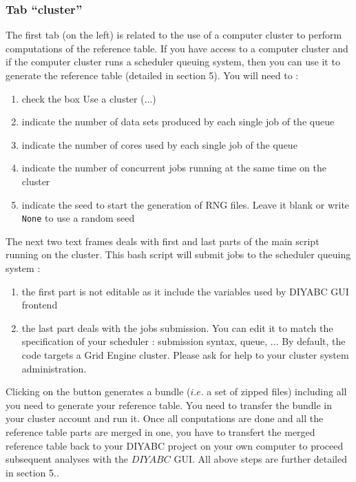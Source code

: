 \subsubsection{Tab \textsf{``cluster''}}\label{clustergui}
The first tab (on the left) is related to the use of a computer cluster to perform computations of the reference table. If you have access to a computer cluster and if the computer cluster runs a scheduler queuing system, then you can use it to generate the reference table (detailed in section 5). You will need to :
\begin{enumerate}
 \item check the box \textsf{Use a cluster (...)}
 \item indicate the number of data sets produced by each single job of the queue
 \item indicate the number of cores used by each single job of the queue
 \item indicate the number of concurrent jobs running at the same time on the cluster
 \item indicate the seed to start the generation of RNG files. Leave it blank or write \texttt{None} to use a random seed
\end{enumerate}

The next two text frames deals with first and last parts of the main script running on the cluster. This bash script will submit jobs to the scheduler queuing system :
\begin{enumerate}
 \item the first part is not editable as it include the variables used by DIYABC GUI frontend
 \item the last part deals with the jobs submission. You can edit it to match the specification of your scheduler : submission syntax, queue, ... By default, the code targets a Grid Engine cluster. Please ask for help to your cluster system administration.
\end{enumerate}


Clicking on the  button generates a bundle ($i.e.$ a set of zipped files) including all you need to generate your reference table. You need to transfer the bundle in your cluster account and run it. Once all conputations are done and all the reference table parts are merged in one, you have to transfert the merged reference table back to your DIYABC project on your own computer to proceed subsequent analyses with the $DIYABC$ GUI. All above steps are further detailed in section 5..


